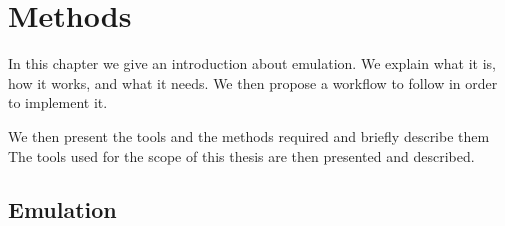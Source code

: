 \chapter{Methods}
\label{chp:methods}




In this chapter we give an introduction about emulation.
We explain what it is, how it works, and what it needs.
We then propose a workflow to follow in order to implement it.

We then present the tools and the methods required and briefly describe them
The tools used for the scope of this thesis are then presented and described.







\section{Emulation}




